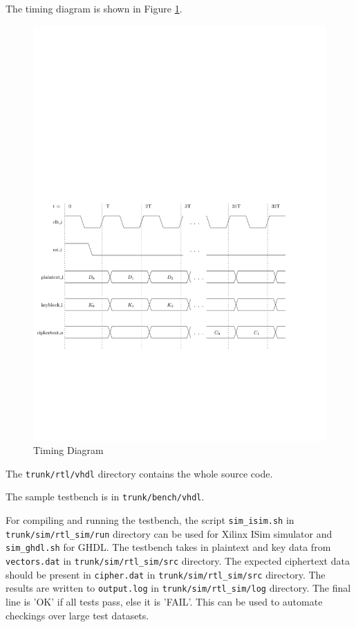 \documentclass[a4paper]{article}
\begin{document}
The timing diagram is shown in Figure \ref{clock}.
\begin{figure}[H]
\centering
\includegraphics[scale=0.7]{clock}
\caption{Timing Diagram}
\label{clock}
\end{figure}

The \texttt{trunk/rtl/vhdl} directory contains the whole source code.

The sample testbench is in \texttt{trunk/bench/vhdl}.

For compiling and running the testbench, the script \texttt{sim\_isim.sh} in \texttt{trunk/sim/rtl\_sim/run} directory can be used for Xilinx ISim simulator and \texttt{sim\_ghdl.sh} for GHDL. The testbench takes in plaintext and key data from \texttt{vectors.dat} in \texttt{trunk/sim/rtl\_sim/src} directory. The expected ciphertext data should be present in \texttt{cipher.dat} in \texttt{trunk/sim/rtl\_sim/src} directory. The results are written to \texttt{output.log} in \texttt{trunk/sim/rtl\_sim/log} directory. The final line is 'OK' if all tests pass, else it is 'FAIL'. This can be used to automate checkings over large test datasets.
\end{document}
